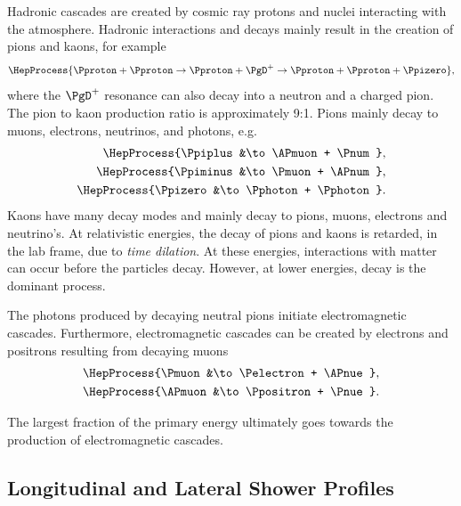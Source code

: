 Hadronic cascades are created by cosmic ray protons and nuclei interacting with
the atmosphere.  Hadronic interactions and decays mainly result in the creation
of pions and kaons, for example
\begin{equation}
\HepProcess{\Pproton + \Pproton \to \Pproton + \PgD^+ \to \Pproton + \Pproton +
\Ppizero},
\end{equation}
where the $\PgD^+$ resonance can also decay into a neutron and a charged pion.
The pion to kaon production ratio is approximately 9:1.  Pions mainly decay to
muons, electrons, neutrinos, and photons, e.g.
\begin{equation}
\begin{split}
\HepProcess{\Ppiplus &\to \APmuon + \Pnum}, \\
\HepProcess{\Ppiminus &\to \Pmuon + \APnum}, \\
\HepProcess{\Ppizero &\to \Pphoton + \Pphoton}.
\end{split}
\end{equation}
Kaons have many decay modes \cite{Cirigliano:2012} and mainly decay to pions,
muons, electrons and neutrino's. At relativistic energies, the decay of pions and
kaons is retarded, in the lab frame, due to \emph{time dilation}. At
these energies, interactions with matter can occur before the particles decay.
However, at lower energies, decay is the dominant process.

The photons produced by decaying neutral pions initiate electromagnetic
cascades.  Furthermore, electromagnetic cascades can be created by electrons and
positrons resulting from decaying muons
\begin{equation}
\begin{split}
\HepProcess{\Pmuon &\to \Pelectron + \APnue}, \\
\HepProcess{\APmuon &\to \Ppositron + \Pnue}.
\end{split}
\end{equation}

The largest fraction of the primary energy ultimately goes towards the production
of electromagnetic cascades.


\subsection{Longitudinal and Lateral Shower Profiles}

